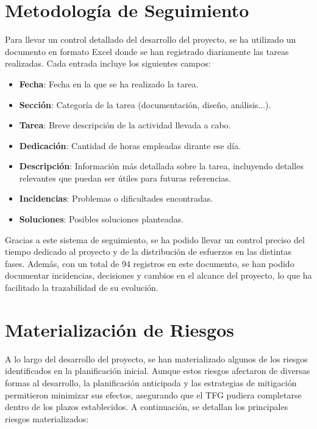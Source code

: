 \section{Metodología de Seguimiento}

Para llevar un control detallado del desarrollo del proyecto, se ha utilizado un documento en formato Excel donde se han registrado diariamente las tareas realizadas. Cada entrada incluye los siguientes campos:

\begin{itemize}\setlength{\itemsep}{0pt}
    \item \textbf{Fecha}: Fecha en la que se ha realizado la tarea.
    \item \textbf{Sección}: Categoría de la tarea (documentación, diseño, análisis...).
    \item \textbf{Tarea}: Breve descripción de la actividad llevada a cabo.
    \item \textbf{Dedicación}: Cantidad de horas empleadas dirante ese día.
    \item \textbf{Descripción}: Información más detallada sobre la tarea, incluyendo detalles relevantes que puedan ser útiles para futuras referencias.
    \item \textbf{Incidencias}: Problemas o dificultades encontradas.
    \item \textbf{Soluciones}: Posibles soluciones planteadas.
\end{itemize}

Gracias a este sistema de seguimiento, se ha podido llevar un control preciso del tiempo dedicado al proyecto y de la distribución de esfuerzos en las distintas fases. Además, con un total de 94 registros en este documento, se han podido documentar incidencias, decisiones y cambios en el alcance del proyecto, lo que ha facilitado la trazabilidad de su evolución.


\section{Materialización de Riesgos} \label{sec:materializacion_riesgos}

A lo largo del desarrollo del proyecto, se han materializado algunos de los riesgos identificados en la planificación inicial. Aunque estos riesgos afectaron de diversas formas al desarrollo, la planificación anticipada y las estrategias de mitigación permitieron minimizar sus efectos, asegurando que el TFG pudiera completarse dentro de los plazos establecidos. A continuación, se detallan los principales riesgos materializados:

